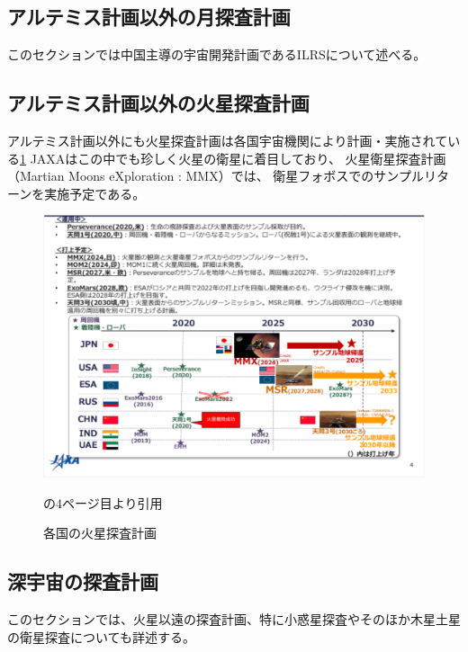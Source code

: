 \subsection{アルテミス計画以外の月探査計画}
\label{subsection:その他の月・火星探査計画}
このセクションでは中国主導の宇宙開発計画であるILRSについて述べる。

\subsection{アルテミス計画以外の火星探査計画}
\label{subsection:アルテミス計画以外の火星探査計画}
アルテミス計画以外にも火星探査計画は各国宇宙機関により計画・実施されている\ref{fig:mars_explorations}
JAXAはこの中でも珍しく火星の衛星に着目しており、
火星衛星探査計画（Martian Moons eXploration : MMX）では、
衛星フォボスでのサンプルリターンを実施予定である。

\begin{figure}[tbh]
    \centering
    \includegraphics[width=0.7\textheight]{img/mars_explorations.pdf}
    \caption{各国の火星探査計画}
    \label{fig:mars_explorations}
    \begin{minipage}{\textwidth}
        \centering
        \cite{isas2023}の4ページ目より引用
    \end{minipage}
\end{figure}


\subsection{深宇宙の探査計画}
\label{section:深宇宙の探査計画}
このセクションでは、火星以遠の探査計画、特に小惑星探査やそのほか木星土星の衛星探査についても詳述する。

